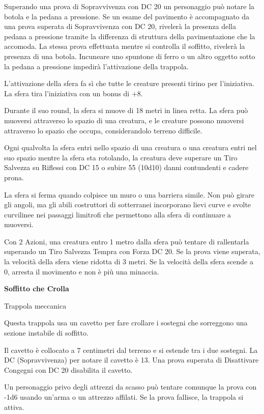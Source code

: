 \begin{multicols}{2}
Superando una prova di Sopravvivenza con DC 20 un personaggio può notare la botola e la pedana a pressione. Se un esame del pavimento è accompagnato da una prova superata di Sopravvivenza con DC 20, rivelerà la presenza della pedana a pressione tramite la differenza di struttura della pavimentazione che la accomoda. La stessa prova effettuata mentre si controlla il soffitto, rivelerà la presenza di una botola. Incuneare uno spuntone di ferro o un altro oggetto sotto la pedana a pressione impedirà l'attivazione della trappola.

L'attivazione della sfera fa sì che tutte le creature presenti tirino per l'iniziativa. La sfera tira l'iniziativa con un bonus di +8.

Durante il suo round, la sfera si muove di 18 metri in linea retta. La sfera può muoversi attraverso lo spazio di una creatura, e le creature possono muoversi attraverso lo spazio che occupa, considerandolo terreno difficile.

Ogni qualvolta la sfera entri nello spazio di una creatura o una creatura entri nel suo spazio mentre la sfera sta rotolando, la creatura deve superare un Tiro Salvezza su Riflessi con DC 15 o subire 55 (10d10) danni contundenti e cadere prona.

La sfera si ferma quando colpisce un muro o una barriera simile. Non può girare gli angoli, ma gli abili costruttori di sotterranei incorporano lievi curve e svolte curvilinee nei passaggi limitrofi che permettono alla sfera di continuare a muoversi.

Con 2 Azioni, una creatura entro 1 metro dalla sfera può tentare di rallentarla superando un Tiro Salvezza Tempra con Forza DC 20. Se la prova viene superata, la velocità della sfera viene ridotta di 3 metri. Se la velocità della sfera scende a 0, arresta il movimento e non è più una minaccia.

\medskip

\textbf{Soffitto che Crolla}

Trappola meccanica

Questa trappola usa un cavetto per fare crollare i sostegni che sorreggono una sezione instabile di soffitto.

Il cavetto è collocato a 7 centimetri dal terreno e si estende tra i due sostegni. La DC (Sopravvivenza) per notare il cavetto è 13. Una prova superata di Disattivare Congegni con DC 20 disabilita il cavetto.

Un personaggio privo degli attrezzi da scasso può tentare comunque la prova con -1d6 usando un'arma o un attrezzo affilati. Se la prova fallisce, la trappola si attiva.


\end{multicols}

